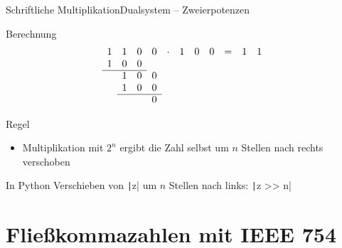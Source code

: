 \documentclass[xelatex,aspectratio=169]{beamer}
\begin{document}
\begin{frame}{Schriftliche Multiplikation}{Dualsystem -- Zweierpotenzen}
  \begin{block}{Berechnung}
    \[
      \begin{array}{ccccccccccccccccccc}
        1 & 1 & 0 & 0 & \cdot & 1 & 0 & 0 & = & 1 & 1 \\
        1 & 0 & 0 &   &       &   &   &               \\
        \cline{1-3}
          & 1 & 0 & 0 &       &   &   &               \\
          & 1 & 0 & 0 &       &   &   &               \\
        \cline{2-4}
          &   &   & 0 &       &   &   &               \\
      \end{array}
    \]
  \end{block}

  \begin{block}{Regel}
    \begin{itemize}
      \item Multiplikation mit $2^n$ ergibt die Zahl selbst um $n$ Stellen nach rechts verschoben
    \end{itemize}
  \end{block}

  \begin{exampleblock}{In Python}
    Verschieben von \texttt|z| um $n$ Stellen nach links: \texttt|z >> n|
  \end{exampleblock}
\end{frame}

\section[Fließkommazahlen]{Fließkommazahlen mit IEEE 754}
\end{document}
